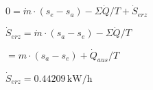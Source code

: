 \( 0 = \dot{m} \cdot (s_e - s_a) - \Sigma \dot{Q} / T + \dot{S}_{erz} \)  

\( \dot{S}_{erz} = \dot{m} \cdot (s_a - s_e) - \Sigma \dot{Q} / T \)  

\( = m \cdot (s_a - s_e) + \dot{Q}_{aus} / T \)  

\( \dot{S}_{erz} = 0.44209 \, \text{kW} / \text{h} \)